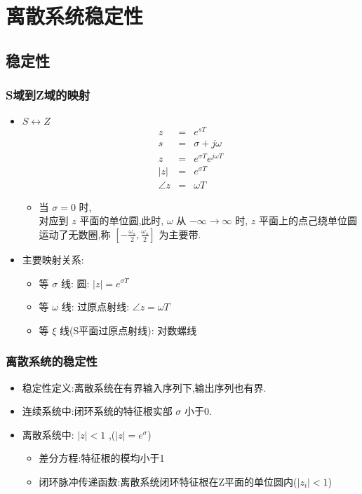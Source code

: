 \documentclass[table]{beamer}
\begin{document}
\section{离散系统稳定性}
\label{sec-5}
\subsection{稳定性}
\label{sec-5-1}
\begin{frame}
\frametitle{S域到Z域的映射}
\label{sec-5-1-1}
\begin{itemize}

\item $S\leftrightarrow Z$
\label{sec-5-1-1-1}%
\begin{eqnarray*}
z & = & e^{sT}\\
s &=& \sigma+j\omega \\
z &=& e^{\sigma T}e^{j\omega T} \\
|z| &=& e^{\sigma T} \\
\angle z &=& \omega T
\end{eqnarray*}
\begin{itemize}

\item 当  $\sigma=0$  时,\\
\label{sec-5-1-1-1-1}%
对应到  $z$  平面的单位圆,此时,  $\omega$  从  $-\infty\rightarrow\infty$ 时,  $z$  平面上的点己绕单位圆运动了无数圈,称  $[-\frac{\omega_s}{2},\frac{\omega_s}{2}]$  为主要带.

\end{itemize} %

\item 主要映射关系:
\label{sec-5-1-1-2}%
\begin{itemize}
\item 等  $\sigma$  线: 圆:   $|z|=e^{\sigma T}$
\item 等  $\omega$  线: 过原点射线:  $\angle z=\omega T$
\item 等  $\xi$  线(S平面过原点射线): 对数螺线
\end{itemize}

\end{itemize} %
\end{frame}
\begin{frame}
\frametitle{离散系统的稳定性}
\label{sec-5-1-2}

\begin{itemize}
\item 稳定性定义:离散系统在有界输入序列下,输出序列也有界.
\item <2->连续系统中:闭环系统的特征根实部 $\sigma$  小于0.
\item <3->离散系统中:  $|z|<1$ ,($|z|=e^{\sigma}$)
\begin{itemize}
\item 差分方程:特征根的模均小于1
\item 闭环脉冲传递函数:离散系统闭环特征根在Z平面的单位圆内($|z_i|<1$)
\end{itemize}
\end{itemize}
\end{frame}
\end{document}
